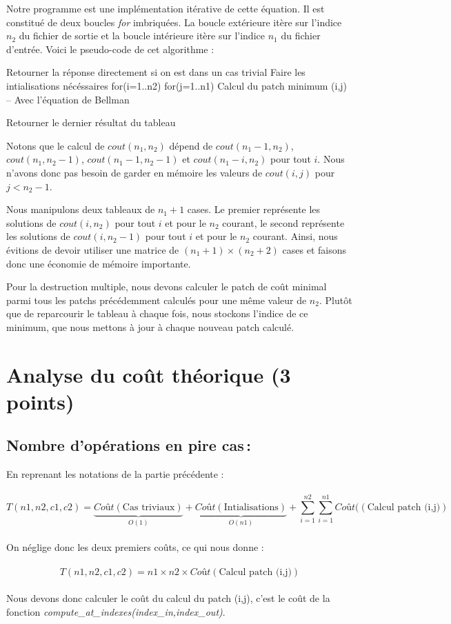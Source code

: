 \documentclass[a4paper, 10pt, french]{article}
\begin{document}
Notre programme est une implémentation itérative de cette équation. Il est constitué
de deux boucles \emph{for} imbriquées. La boucle extérieure itère sur l'indice $n_2$
du fichier de sortie et la boucle intérieure itère sur l'indice $n_1$ du fichier
d'entrée.
Voici le pseudo-code de cet algorithme :
\begin{verbatimtab}
	Retourner la réponse directement si on est dans un cas trivial
	Faire les intialisations nécéssaires
	for(i=1..n2)
	  for(j=1..n1)
		Calcul du patch minimum (i,j) -- Avec l'équation de Bellman

	Retourner le dernier résultat du tableau
\end{verbatimtab}
Notons que le calcul de $cout(n_1, n_2)$ dépend de $cout(n_1-1, n_2)$,
$cout(n_1, n_2-1)$, $cout(n_1-1, n_2-1)$ et $cout(n_1-i, n_2)$ pour tout $i$.
Nous n'avons donc pas besoin de garder en mémoire les valeurs de $cout(i, j)$ pour
$j < n_2-1$.

Nous manipulons deux tableaux de $n_1+1$ cases. Le premier représente les solutions
de $cout(i, n_2)$ pour tout $i$ et pour le $n_2$ courant, le second représente
les solutions de $cout(i, n_2-1)$ pour tout $i$ et pour le $n_2$ courant.
Ainsi, nous évitions de devoir utiliser une matrice de $(n_1+1)\times(n_2+2)$ cases
et faisons donc une économie de mémoire importante.

Pour la destruction multiple, nous devons calculer le patch de coût minimal parmi
tous les patchs précédemment calculés pour une même valeur de $n_2$.
Plutôt que de reparcourir le tableau à chaque fois, nous stockons l'indice de
ce minimum, que nous mettons à jour à chaque nouveau patch calculé.

\section{Analyse du coût théorique (3 points)}

  \subsection{Nombre  d'opérations en pire cas\,:}
    En reprenant les notations de la partie précédente : \\ \\
    $$T(n1,n2,c1,c2) = \underbrace{Coût(\text{Cas triviaux})}_{O(1)} + 
    \underbrace{Coût(\text{Intialisations})}_{O(n1)} + 
    \sum_{i=1}^{n2} \sum_{i=1}^{n1} Coût((\text{Calcul patch (i,j)})$$ \\
	On néglige donc les deux premiers coûts, ce qui nous donne : \\ \\
	$$T(n1,n2,c1,c2) = n1 \times n2 \times Coût(\text{Calcul patch (i,j)})$$
	\\ 
	Nous devons donc calculer le coût du calcul du patch (i,j), c'est le coût de la fonction \emph{compute\_at\_indexes(index\_in,index\_out)}.\\ \\
\end{document}

